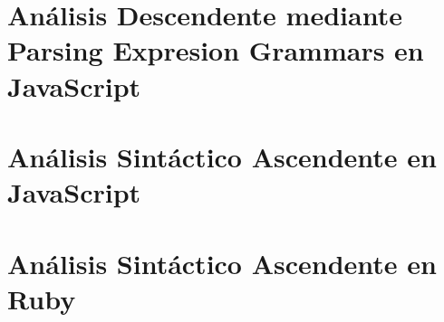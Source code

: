 \documentclass[11pt,a4paper,oneside,onecolumn]{book}
\begin{document}
  

  

\chapter{Análisis Descendente mediante Parsing Expresion Grammars en JavaScript}
  

%

\chapter{Análisis Sintáctico Ascendente en JavaScript}


%

%

\chapter{Análisis Sintáctico Ascendente en Ruby}


%


\end{document}
